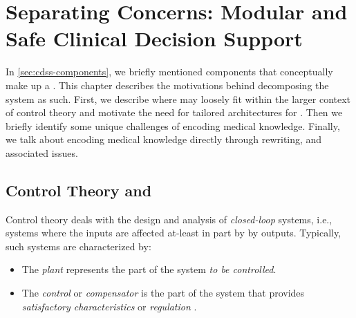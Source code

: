 \chapter{Separating Concerns: Modular and Safe Clinical Decision Support}\label{chapter:separating-concerns}

In \autoref{sec:cdss-components}, we briefly mentioned components that
conceptually make up a \CDSS{}. This chapter describes the motivations
behind decomposing the system as such. First, we describe where
\CDSSs{} may loosely fit within the larger context of control
theory and motivate the need for tailored architectures for \CDSSs{}.
Then we briefly identify some unique challenges of encoding medical knowledge.
Finally, we talk about encoding medical knowledge directly through
rewriting, and associated issues.

\section{Control Theory and \CDSSs{}}\label{sec:control-theory-cdss-comparison}
Control theory deals with the design and analysis of \emph{closed-loop}
systems, i.e., systems where the inputs are affected at-least in part by
by outputs. Typically, such systems are characterized by:
\begin{itemize}
  \item The \emph{plant} represents the part of the system \emph{to be
  controlled}.
  \item The \emph{control} or \emph{compensator} is the part of the system
  that provides \emph{satisfactory characteristics} or \emph{regulation}
  \cite{SimrockTR08}.
\end{itemize}


